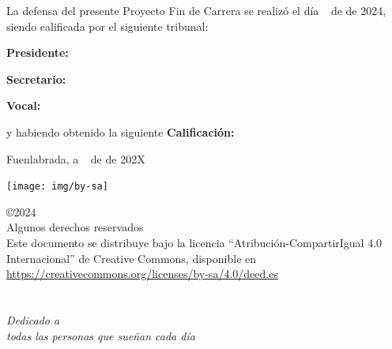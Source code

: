 \documentclass[a4paper, 12pt]{book}
\makeatletter
\let\theauthor\@author
\makeatother
\begin{document}
\vspace{0.8cm}
La defensa del presente Proyecto Fin de Carrera se realizó el día \qquad$\;\,$ de \qquad\qquad\qquad\qquad \newline de 2024, siendo calificada por el siguiente tribunal:


\vspace{0.5cm}
\textbf{Presidente:}

\vspace{1cm}
\textbf{Secretario:}

\vspace{1cm}
\textbf{Vocal:}


\vspace{1cm}
y habiendo obtenido la siguiente \textbf{Calificación:}


\vspace{1cm}
\begin{flushright}
Fuenlabrada, a \qquad$\;\,$ de \qquad\qquad\qquad\qquad de 202X
\end{flushright}

\vspace{1cm}

\texttt{[image: img/by-sa]}

\noindent©2024 \theauthor  \\
Algunos derechos reservados  \\
Este documento se distribuye bajo la licencia ``Atribución-CompartirIgual 4.0 Internacional'' de Creative Commons, disponible en \\
\url{https://creativecommons.org/licenses/by-sa/4.0/deed.es}



\chapter*{}
\begin{flushright}
\textit{Dedicado a \\
todas las personas que sueñan cada día}
\end{flushright}

\end{document}
